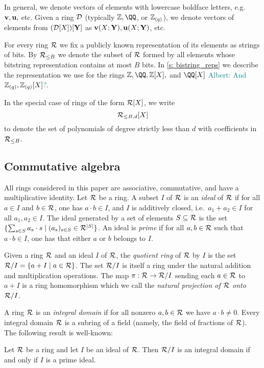 \documentclass[11pt,letterpaper,usenames,dvipsnames]{article}
\newcommand{\albert}[1]{\textcolor{teal}{Albert: {#1}}}
\newcommand{\alberturgent}[1]{\textcolor{red}{Albert: {#1}}}
\begin{document}
In general, we denote vectors of elements with lowercase boldface letters, e.g.\ $\mathbf{v},\mathbf{u},$ etc. Given a ring $\mathcal{D}$ (typically $\ZZ, \QQ$, or $\mathbb{Z}_{(q)}$), we denote vectors of elements from $(\mathcal{D}[X])[\mathbf{Y}]$ as $\mathbf{v}(X;\mathbf{Y}), \mathbf{u}(X;\mathbf{Y})$, etc.


For every ring $\mathcal{R}$  we fix a publicly known representation of its elements as strings of bits. By $\mathcal{R}_{\leq B}$ we denote the subset of $\mathcal{R}$ formed by all elements whose bitstring representation contains at most $B$ bits. In \cref{s: bistring_reps} we describe the representation we use for the rings $\ZZ,\QQ, \ZZ[X],$ and $\QQ[X]$ \albert{And $\mathbb{Z}_{(q)},\mathbb{Z}_{(q)}[X]$?}.

In the special case of rings of the form $\mathcal{R}[X]$, we write $$\mathcal{R}_{\leq B, d}[X]$$ to denote the set of polynomials of degree strictly less than $d$ with coefficients in $\mathcal{R}_{\leq B}$.


\subsection{Commutative algebra}
All rings considered in this paper are associative, commutative, and have a multiplicative identity. Let $\mathcal{R}$ be a ring. A subset $I$ of $\mathcal{R}$ is an \emph{ideal} of $\mathcal{R}$ if for all $a\in I$ and $b\in \mathcal{R}$, one has $a\cdot b \in I$, and $I$ is additively closed, i.e.\ $a_1 + a_2 \in I$ for all $a_1, a_2\in I$. The ideal generated by a set of elements $S\subseteq \mathcal{R}$ is the set $\{\sum_{s\in S} a_s \cdot s \mid (a_s)_{s\in S}\in \mathcal{R}^{|S|}\}$. An ideal is \emph{prime} if for all $a,b\in \mathcal{R}$ such that $a\cdot b \in I$, one has that either $a$ or $b$ belongs to $I$. 

Given a ring $\mathcal{R}$ and an ideal $I$ of $\mathcal{R}$, the \emph{quotient ring} of $\mathcal{R}$ by $I$ is the set  $\mathcal{R}/I =\{a+I \mid a\in \mathcal{R}\}$. The set $\mathcal{R}/I$ is itself a ring under the natural addition and multiplication operations.  The map $\pi:\mathcal{R}\to \mathcal{R}/I$ sending each $a\in \mathcal{R}$ to $a+I$ is a ring homomorphism which we call the \emph{natural projection of $\mathcal{R}$ onto $\mathcal{R}/I$.}

A ring $\mathcal{R}$ is an \emph{integral domain} if for all nonzero $a,b\in \mathcal{R}$ we have $a\cdot b\neq 0$. Every integral domain $\mathcal{R}$ is a subring of a field (namely, the field of fractions of $\mathcal{R}$). The following result is well-known:
\begin{remark}\label{r: domain_prime}
Let $\mathcal{R}$ be a ring and let $I$  be an ideal of $\mathcal{R}$. Then $\mathcal{R}/I$ is an integral domain if and only if $I$ is a prime ideal.
\end{remark}
\end{document}
